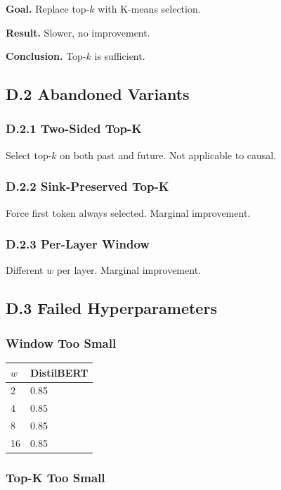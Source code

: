\textbf{Goal.} Replace top-$k$ with K-means selection.

\textbf{Result.} Slower, no improvement.

\textbf{Conclusion.} Top-$k$ is sufficient.

\subsection{D.2 Abandoned Variants}

\subsubsection{D.2.1 Two-Sided Top-K}

Select top-$k$ on both past and future. Not applicable to causal.

\subsubsection{D.2.2 Sink-Preserved Top-K}

Force first token always selected. Marginal improvement.

\subsubsection{D.2.3 Per-Layer Window}

Different $w$ per layer. Marginal improvement.

\subsection{D.3 Failed Hyperparameters}

\subsubsection{Window Too Small}

\begin{table}[H]
\centering
\small
\begin{tabular}{ll}
\toprule
\textbf{$w$} & \textbf{DistilBERT} \\
\midrule
2 & 0.85 \\
4 & 0.85 \\
8 & 0.85 \\
16 & 0.85 \\
\bottomrule
\end{tabular}
\end{table}

\subsubsection{Top-K Too Small}


